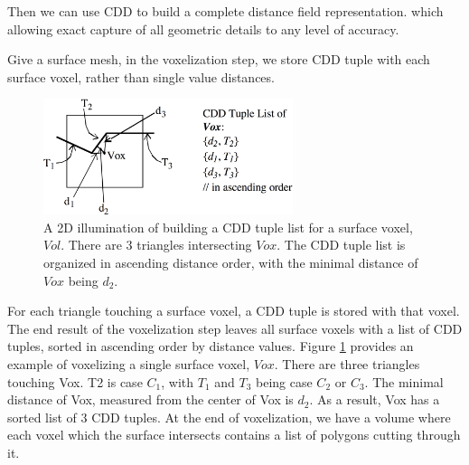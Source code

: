 Then we can use CDD to build a complete distance field representation. which allowing exact capture of all geometric details to any level of accuracy.

Give a surface mesh, in the voxelization step, we store CDD tuple with each surface voxel, rather than single value distances.

\begin{figure}
	\begin{center}
		\includegraphics[width=0.65\textwidth]{graphics/df/cdd-tuple-list}
	\end{center}
	\caption{A 2D illumination of building a CDD tuple list for a surface voxel, $Vol$. There are 3 triangles intersecting $Vox$. The CDD tuple list is organized in ascending distance order, with the minimal distance of $Vox$ being $d_{2}$.}
	\label{f:cdd-tuple-list}
\end{figure}

For each triangle touching a surface voxel, a CDD tuple is stored with that voxel. The end result of the voxelization step leaves all surface voxels with a list of CDD tuples, sorted in ascending order by distance values. Figure \ref{f:cdd-tuple-list} provides an example of voxelizing a single surface voxel, $Vox$. There are three triangles touching Vox. T2 is case $C_1$, with $T_1$ and $T_3$ being case $C_{2}$ or $C_{3}$. The minimal distance of Vox, measured from the center of Vox is $d_2$. As a result, Vox has a sorted list of 3 CDD tuples.
At the end of voxelization, we have a volume where each voxel which the surface intersects contains a list of polygons cutting through it.









